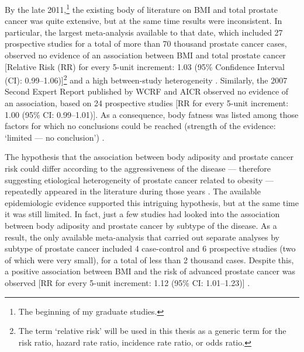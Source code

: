 By the late 2011,\footnote{The beginning of my graduate studies.} the existing body of literature on BMI and total prostate cancer was quite extensive, but at the same time results were inconsistent. In particular, the largest meta-analysis available to that date, which included 27 prospective studies for a total of more than 70 thousand prostate cancer cases, observed no evidence of an association between BMI and total prostate cancer [Relative Risk (RR) for every 5-unit increment: 1.03 (95\% Confidence Interval (CI): 0.99--1.06)]\footnote{The term `relative risk' will be used in this thesis as a generic term for the risk ratio, hazard rate ratio, incidence rate ratio, or odds ratio.} and a high between-study heterogeneity \citep{renehan_bodymass_2008}. Similarly, the 2007 Second Expert Report published by WCRF and AICR observed no evidence of an association, based on 24 prospective studies [RR for every 5-unit increment: 1.00 (95\% CI: 0.99--1.01)]. As a consequence, body fatness was listed among those factors for which no conclusions could be reached (strength of the evidence: `limited --- no conclusion') \citep[section~7.14]{wcrf_food_2007}. 

The hypothesis that the association between body adiposity and prostate cancer risk could differ according to the aggressiveness of the disease --- therefore suggesting etiological heterogeneity of prostate cancer related to obesity --- repeatedly appeared in the literature during those years  \citep{freedland_are_2006, freedland_obesity_2007, hsing_obesity_2007, hsing_androgen_2008}. The available epidemiologic evidence supported this intriguing hypothesis, but at the same time it was still limited. In fact, just a few studies had looked into the association between body adiposity and prostate cancer by subtype of the disease. As a result, the only available meta-analysis  that carried out separate analyses by subtype of prostate cancer included 4 case-control and 6 prospective studies (two of which were very small), for a total of less than 2 thousand cases. Despite this, a positive association between BMI and the risk of advanced prostate cancer was observed [RR for every 5-unit increment: 1.12 (95\% CI: 1.01--1.23)] \citep{macinnis_body_2006}.


